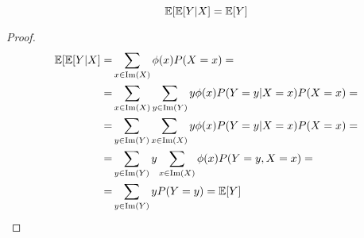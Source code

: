\begin{prop}
    \[\esp[\esp[Y \vert X] = \esp[Y]\]
\end{prop}

\begin{proof}
    \begin{align*}
    \esp[\esp[Y \vert X] = & \sum_{x\in\im(X)} \phi(x)P(X=x) = \\
    = & \sum_{x\in\im(X)} \sum_{y\in\im(Y)} y\phi(x)P(Y=y \vert X=x)P(X=x) = \\
    = & \sum_{y\in\im(Y)} \sum_{x\in\im(X)} y\phi(x)P(Y=y \vert X=x)P(X=x) = \\
    = & \sum_{y\in\im(Y)} y\sum_{x\in\im(X)} \phi(x)P(Y=y,X=x) = \\
    = & \sum_{y\in\im(Y)} y P(Y=y) = \esp[Y]
    \end{align*}
\end{proof}


